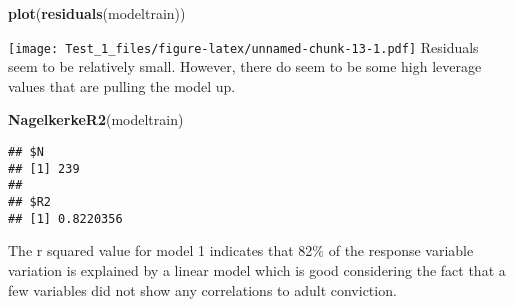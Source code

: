 \documentclass[]{article}
\newenvironment{Shaded}{\begin{snugshade}}{\end{snugshade}}
\newcommand{\KeywordTok}[1]{\textcolor[rgb]{0.13,0.29,0.53}{\textbf{#1}}}
\newcommand{\NormalTok}[1]{#1}
\begin{document}
\begin{Shaded}
\begin{Highlighting}[]
\KeywordTok{plot}\NormalTok{(}\KeywordTok{residuals}\NormalTok{(modeltrain))}
\end{Highlighting}
\end{Shaded}

\texttt{[image: Test\_1\_files/figure-latex/unnamed-chunk-13-1.pdf]}
Residuals seem to be relatively small. However, there do seem to be some
high leverage values that are pulling the model up.

\begin{Shaded}
\begin{Highlighting}[]
\KeywordTok{NagelkerkeR2}\NormalTok{(modeltrain)}
\end{Highlighting}
\end{Shaded}

\begin{verbatim}
## $N
## [1] 239
## 
## $R2
## [1] 0.8220356
\end{verbatim}

The r squared value for model 1 indicates that 82\% of the response
variable variation is explained by a linear model which is good
considering the fact that a few variables did not show any correlations
to adult conviction.
\end{document}
